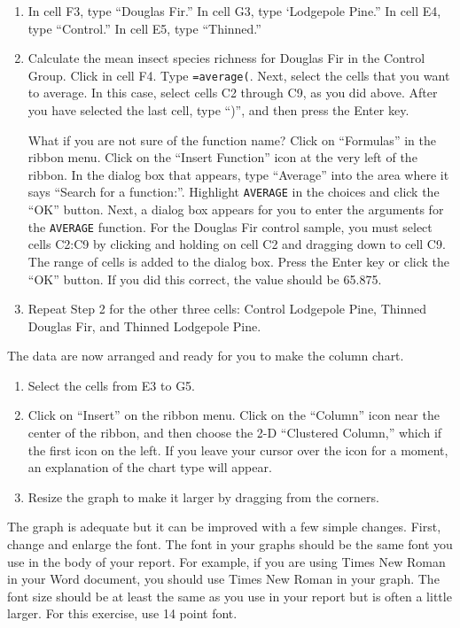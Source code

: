\documentclass[11pt]{article}
\begin{document}
\begin{enumerate}
	\item In cell F3, type “Douglas Fir.” In cell G3, type ‘Lodgepole Pine.” In cell E4, type “Control.” In cell E5, type “Thinned.” 

	\item Calculate the mean insect species richness for Douglas Fir in the Control Group. Click in cell F4. Type \texttt{=average(}. Next, select the cells that you want to average. In this case, select cells C2 through C9, as you did above. After you have selected the last cell, type “)”, and then press the Enter key. 

What if you are not sure of the function name? Click on “Formulas” in the ribbon menu. Click on the “Insert Function” icon at the very left of the ribbon. In the dialog box that appears, type “Average” into the area where it says “Search for a function:”. Highlight \texttt{AVERAGE} in the choices and click the “OK” button. Next, a dialog box appears for you to enter the arguments for the \texttt{AVERAGE} function. For the Douglas Fir control sample, you must select cells C2:C9 by clicking and holding on cell C2 and dragging down to cell C9. The range of cells is added to the dialog box. Press the Enter key or click the “OK” button. If you did this correct, the value should be 65.875.

	\item Repeat Step 2 for the other three cells: Control Lodgepole Pine, Thinned Douglas Fir, and Thinned Lodgepole Pine. 
\end{enumerate}

The data are now arranged and ready for you to make the column chart.

\begin{enumerate}[resume]
	\item Select the cells from E3 to G5.

	\item Click on “Insert” on the ribbon menu. Click on the “Column” icon near the center of the ribbon, and then choose the 2-D “Clustered Column,” which if the first icon on the left. If you leave your cursor over the icon for a moment, an explanation of the chart type will appear.

	\item Resize the graph to make it larger by dragging from the corners.
\end{enumerate}

The graph is adequate but it can be improved with a few simple changes. First, change and enlarge the font. The font in your graphs should be the same font you use in the body of your report. For example, if you are using Times New Roman in your Word document, you should use Times New Roman in your graph. The font size should be at least the same as you use in your report but is often a little larger. For this exercise, use 14 point font.
\end{document}
